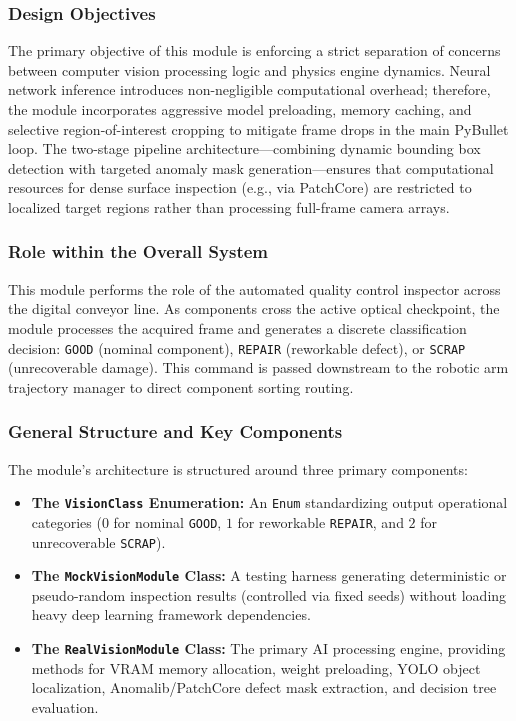 \documentclass{article}
\begin{document}
\subsubsection{Design Objectives}
The primary objective of this module is enforcing a strict separation of concerns between computer vision processing logic and physics engine dynamics. Neural network inference introduces non-negligible computational overhead; therefore, the module incorporates aggressive model preloading, memory caching, and selective region-of-interest cropping to mitigate frame drops in the main PyBullet loop. The two-stage pipeline architecture—combining dynamic bounding box detection with targeted anomaly mask generation—ensures that computational resources for dense surface inspection (e.g., via PatchCore) are restricted to localized target regions rather than processing full-frame camera arrays.

\subsubsection{Role within the Overall System}
This module performs the role of the automated quality control inspector across the digital conveyor line. As components cross the active optical checkpoint, the module processes the acquired frame and generates a discrete classification decision: \texttt{GOOD} (nominal component), \texttt{REPAIR} (reworkable defect), or \texttt{SCRAP} (unrecoverable damage). This command is passed downstream to the robotic arm trajectory manager to direct component sorting routing.

\subsubsection{General Structure and Key Components}
The module's architecture is structured around three primary components:

\begin{itemize}
	\item \textbf{The \texttt{VisionClass} Enumeration:} An \texttt{Enum} standardizing output operational categories ($0$ for nominal \texttt{GOOD}, $1$ for reworkable \texttt{REPAIR}, and $2$ for unrecoverable \texttt{SCRAP}).
	\item \textbf{The \texttt{MockVisionModule} Class:} A testing harness generating deterministic or pseudo-random inspection results (controlled via fixed seeds) without loading heavy deep learning framework dependencies.
	\item \textbf{The \texttt{RealVisionModule} Class:} The primary AI processing engine, providing methods for VRAM memory allocation, weight preloading, YOLO object localization, Anomalib/PatchCore defect mask extraction, and decision tree evaluation.
\end{itemize}
\end{document}
